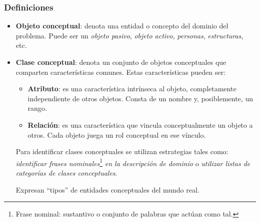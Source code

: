 \documentclass[]{article}
\begin{document}
\subsubsection{Definiciones}
\begin{itemize}
	\item \textbf{Objeto conceptual}: denota una entidad o concepto del dominio del problema. Puede ser un \textit{objeto pasivo}, \textit{objeto activo}, \textit{personas}, \textit{estructuras}, etc.
	\item \textbf{Clase conceptual}: denota un conjunto de objetos conceptuales que comparten características comunes. Estas características pueden ser:
	\begin{itemize}
		\item \textbf{Atributo}: es una característica intrínseca al objeto, completamente independiente de otros objetos. Consta de un nombre y, posiblemente, un rango.
		\item \textbf{Relación}: es una característica que vincula conceptualmente un objeto a otros. Cada objeto juega un rol conceptual en ese vínculo.
	\end{itemize}
	Para identificar clases conceptuales se utilizan estrategias tales como: \textit{identificar frases nominales}\footnote{Frase nominal: sustantivo o conjunto de palabras que actúan como tal.} \textit{en la descripción de dominio} o \textit{utilizar listas de categorías de clases conceptuales}.

	Expresan “tipos” de entidades conceptuales del mundo real.
\end{itemize}
\end{document}
